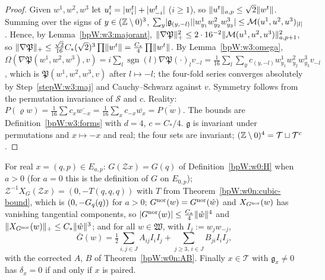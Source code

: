\begin{proof}
\label{stepW:w3:maj}
Given $w^1,w^2,w^3$ let $u^t_i=\lvert w^t_i\rvert+\lvert w^t_{-i}\rvert$ ($i\ge1$), so $\lVert u^t\rVert_{a,p}\le\sqrt2\lVert w^t\rVert$.
Summing over the signs of $y\in(\mathbb{Z}\setminus0)^3$,
$\sum_y\lvert \mathfrak g_{(y,-l)}\rvert\lvert w^1_{y_1}w^2_{y_2}w^3_{y_3}\rvert\le\mathcal M(u^1,u^2,u^3)_{\lvert l\rvert}$.
\label{stepW:w3:gradbound}
Hence, by Lemma~\ref{bpW:w3:majorant},
$\lVert \nabla\mathfrak P\rVert_+^2\le2\cdot16^{-2}\lVert \mathcal M(u^1,u^2,u^3)\rVert^2_{a,p+1}$, so
$\lVert \nabla\mathfrak P\rVert_+\le\frac{\sqrt2}{16}C_*(\sqrt2)^3\prod\lVert w^t\rVert=\frac{C_*}4\prod\lVert w^t\rVert$.
\label{stepW:w3:identify}
By Lemma~\ref{bpW:w3:omega},
$\Omega(\nabla\mathfrak P(w^1,w^2,w^3),v)=i\sum_l\operatorname{sgn}(l)\nabla\mathfrak P(\cdot)_lv_{-l}
=\frac1{16}\sum_l\sum_yc_{(y,-l)}w^1_{y_1}w^2_{y_2}w^3_{y_3}v_{-l}$, which is $\mathfrak P(w^1,w^2,w^3,v)$ after
$l\mapsto-l$; the four-fold series converges absolutely by Step~\ref{stepW:w3:maj} and Cauchy--Schwarz against $v$. Symmetry follows from the permutation invariance of $\mathcal S$ and $c$. Reality:
$P(\varrho w)=\frac1{16}\sum c_x\overline{w_{-x}}=\frac1{16}\sum_x c_{-x}\overline{w_x}=\overline{P(w)}$.
The bounds are Definition~\ref{bpW:w3:forms} with $d=4$, $c=C_*/4$. $\mathfrak g$ is invariant under permutations and
$x\mapsto-x$ and real; the four sets are invariant; $(\mathbb{Z}\setminus0)^4=\mathcal T\sqcup\mathcal T^c$.
\end{proof}

\begin{lemma}\label{bpW:w3:quartic-ident}
For real $x=(q,p)\in E_{a,p}$: $G(\mathcal Zx)=G(q)$ of Definition~\ref{bpW:w0:H} when $a>0$ (for $a=0$ this is the
definition of $G$ on $E_{0,p}$); $\mathcal Z^{-1}X_G(\mathcal Zx)=(0,-T(q,q,q))$ with $T$ from
Theorem~\ref{bpW:w0n:cubic-bound}, which is $(0,-G_q(q))$ for $a>0$; $G^{\rm nor}(w)=G^{\rm nor}(\hat w)$ and
$X_{G^{\rm nor}}(w)$ has vanishing tangential components, so $\lvert G^{\rm nor}(w)\rvert\le\frac{C_*}4\lVert \hat w\rVert^4$ and
$\lVert X_{G^{\rm nor}}(w)\rVert_+\le C_*\lVert \hat w\rVert^3$; and for all $w\in\mathfrak W$, with $I_j:=w_jw_{-j}$,
\[\bar G(w)=\tfrac12\textstyle\sum_{i,j\in J}A_{ij}I_iI_j+\sum_{j\ge3,\,i\in J}B_{ji}I_iI_j,\]
with the corrected $A$, $B$ of Theorem~\ref{bpW:w0n:AB}. Finally $x\in\mathcal T$ with $\mathfrak g_x\ne0$ has
$\delta_x=0$ if and only if $x$ is paired.
\end{lemma}

